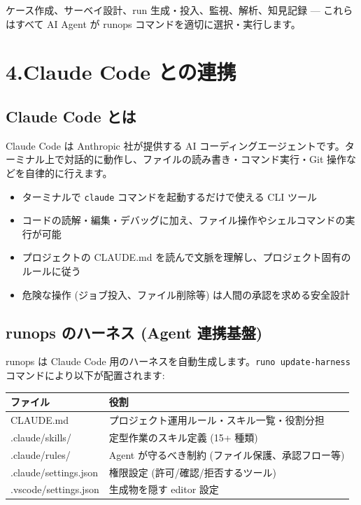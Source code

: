 \documentclass[a4paper,11pt]{article}
\begin{document}
ケース作成、サーベイ設計、run 生成・投入、監視、解析、知見記録 --- これらはすべて AI Agent が runops コマンドを適切に選択・実行します。

\section*{\color{darkblue} 4.\quad Claude Code との連携}

\subsection*{\color{accent} Claude Code とは}

Claude Code は Anthropic 社が提供する AI コーディングエージェントです。ターミナル上で対話的に動作し、ファイルの読み書き・コマンド実行・Git 操作などを自律的に行えます。

\begin{itemize}[nosep]
  \item ターミナルで \texttt{claude} コマンドを起動するだけで使える CLI ツール
  \item コードの読解・編集・デバッグに加え、ファイル操作やシェルコマンドの実行が可能
  \item プロジェクトの CLAUDE.md を読んで文脈を理解し、プロジェクト固有のルールに従う
  \item 危険な操作 (ジョブ投入、ファイル削除等) は人間の承認を求める安全設計
\end{itemize}

\subsection*{\color{accent} runops のハーネス (Agent 連携基盤)}

runops は Claude Code 用のハーネスを自動生成します。\texttt{runo update-harness} コマンドにより以下が配置されます:

\begin{center}
\begin{tabular}{ll}
\toprule
\textbf{ファイル} & \textbf{役割} \\
\midrule
CLAUDE.md & プロジェクト運用ルール・スキル一覧・役割分担 \\
.claude/skills/ & 定型作業のスキル定義 (15+ 種類) \\
.claude/rules/ & Agent が守るべき制約 (ファイル保護、承認フロー等) \\
.claude/settings.json & 権限設定 (許可/確認/拒否するツール) \\
.vscode/settings.json & 生成物を隠す editor 設定 \\
\bottomrule
\end{tabular}
\end{center}
\end{document}
